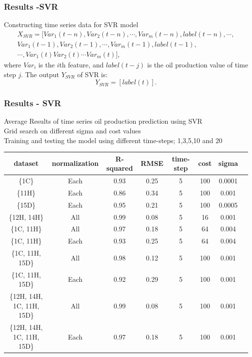 \documentclass[xcolor=table]{beamer}
\begin{document}
\begin{frame}
\frametitle{Results -SVR}

\begin{block}{Constructing time series data for SVR model}
\begin{equation}
\begin{split}
	X_{SVR} = [Var_1(t-n), Var_2(t-n), \cdots, Var_m(t-n), label(t-n), \cdots, 
	\\Var_1(t-1), Var_2(t-1), \cdots, Var_m(t-1), label(t-1), 
	\\ \cdots, Var_1(t)Var_2(t) \cdots Var_m(t)],
\end{split}
\end{equation}
where $Var_i$ is the $i$th feature, and $label(t-j)$ is the oil production value of time step $j$.
The output $Y_{SVR}$ of SVR is:
\begin{equation}
	Y_{SVR} = [label(t)].	
\end{equation}
\end{block}

\end{frame}



\begin{frame}
\frametitle{Results - SVR}
 \begin{block}{}
Average Results of time series oil production prediction using SVR\\
Grid search on different sigma and cost values\\
Training and testing the model using different time-steps; 1,3,5,10 and 20
\end{block}

 \begin{table}[H]
 \begin{adjustbox}{width=0.9\linewidth,center}
 
 		\begin{tabular}{cccccccc}
 			\toprule
 			\multicolumn{1}{c}{dataset}&\multicolumn{1}{c}{normalization}&\multicolumn{1}{c}{R-squared}&\multicolumn{1}{c}{RMSE}&\multicolumn{1}{c}{time-step}&\multicolumn{1}{c}{cost}&\multicolumn{1}{c}{sigma}\tabularnewline
 			\midrule
 			\{1C\} & Each & 0.93 & 0.25 & 5 &100 & 0.0001\tabularnewline
 			\{11H\} & Each & 0.86 & 0.34 & 5 &100 & 0.001\tabularnewline
 			\{15D\} & Each &  0.95& 0.21 & 5 &100 & 0.0005\tabularnewline
 			\{12H, 14H\}& All &\cellcolor{green!40}0.99 & 0.08 & 5 &16 & 0.001\tabularnewline
 			\{1C, 11H\} & All & 0.97 & 0.18 & 5 &64 & 0.004\tabularnewline
 			\{1C, 11H\} & Each & 0.93 & 0.25 & 5 &64 & 0.004\tabularnewline
 			\{1C, 11H, 15D\}  & All &\cellcolor{green!40} 0.98 & 0.12 & 5 &100 & 0.001\tabularnewline
 			\{1C, 11H, 15D\}  & Each & 0.92 & 0.29 & 5 &100 & 0.001\tabularnewline
 			\{12H, 14H, 1C, 11H, 15D\}  & All &\cellcolor{green!40} 0.99 & 0.08 & 5 &100 & 0.001\tabularnewline
 			\{12H, 14H, 1C, 11H, 15D\}  & Each & 0.97 & 0.18 & 5 &100 & 0.001\tabularnewline
 			\bottomrule
 	\end{tabular}
	\end{adjustbox}
 \end{table}
 
\end{frame}
\end{document}
